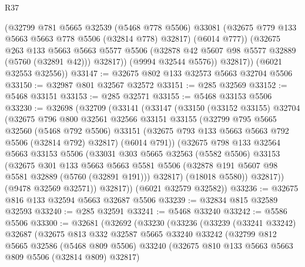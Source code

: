 \begin{lexlean}{R37}
\begin{coremodule}
              (@32799
                @781
                @5665
                @32539
                (@5468 @778 @5506)
                @33081
                (@32675 @779 @133 @5663 @5663 @778 @5506 (@32814 @778) @32817)
                (@6014 @777))
              (@32675
                @263
                @133
                @5663
                @5663
                @5577
                @5506
                (@32878 @42 @5607 @98 @5577 @32889 (@5760 (@32891 @42)))
                @32817))
            (@9994 @32544 @5576))
          @32817))
      (@6021 @32553 @32556))
@33147 := @32675 @802 @133 @32573 @5663 @32704 @5506
@33150 := @32987 @801 @32567 @32572
@33151 := @285 @32569
@33152 := @5468 @33151
@33153 := @285 @32571
@33155 := @5468 @33153 @5506
@33230 := @32698
    (@32709
      (@33141
        (@33147
          (@33150
            (@33152 @33155)
            @32704
            (@32675
              @796
              @800
              @32561
              @32566
              @33151
              @33155
              (@32799
                @795
                @5665
                @32560
                (@5468 @792 @5506)
                @33151
                (@32675 @793 @133 @5663 @5663 @792 @5506 (@32814 @792) @32817)
                (@6014 @791))
              (@32675
                @798
                @133
                @32564
                @5663
                @33153
                @5506
                (@33031
                  @303
                  @5665
                  @32563
                  (@5582 @5506)
                  @33153
                  (@32675
                    @301
                    @133
                    @5663
                    @5663
                    @5581
                    @5506
                    (@32878 @191 @5607 @98 @5581 @32889 (@5760 (@32891 @191)))
                    @32817)
                  (@18018 @5580))
                @32817))
            (@9478 @32569 @32571))
          @32817))
      (@6021 @32579 @32582))
@33236 := @32675 @816 @133 @32594 @5663 @32687 @5506
@33239 := @32834 @815 @32589 @32593
@33240 := @285 @32591
@33241 := @5468 @33240
@33242 := @5586 @5506
@33300 := @32681
    (@32692
      (@33230
        (@33236
          (@33239
            (@33241 @33242)
            @32687
            (@32675
              @813
              @332
              @32587
              @5665
              @33240
              @33242
              (@32799
                @812
                @5665
                @32586
                (@5468 @809 @5506)
                @33240
                (@32675 @810 @133 @5663 @5663 @809 @5506 (@32814 @809) @32817)

\end{coremodule}
\end{lexlean}
